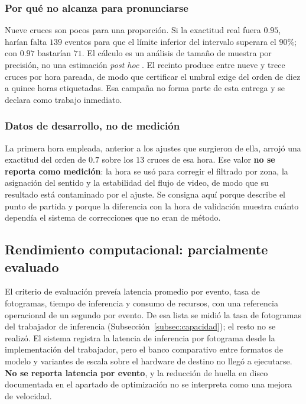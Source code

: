 \subsubsection{Por qué no alcanza para pronunciarse}

Nueve cruces son pocos para una proporción. Si la exactitud real fuera $0{.}95$,
harían falta $139$ eventos para que el límite inferior del intervalo superara el
$90\%$; con $0{.}97$ bastarían $71$. El cálculo es un análisis de tamaño de muestra
por precisión, no una estimación \emph{post hoc} \cite{cohen1988statistical}. El
recinto produce entre nueve y trece cruces por hora pareada, de modo que certificar
el umbral exige del orden de diez a quince horas etiquetadas. Esa campaña no forma
parte de esta entrega y se declara como trabajo inmediato.

\subsubsection{Datos de desarrollo, no de medición}

La primera hora empleada, anterior a los ajustes que surgieron de ella, arrojó una
exactitud del orden de $0{.}7$ sobre los $13$ cruces de esa hora. Ese valor
\textbf{no se reporta como medición}: la hora se usó para corregir el filtrado por
zona, la asignación del sentido y la estabilidad del flujo de video, de modo que su
resultado está contaminado por el ajuste. Se consigna aquí porque describe el punto
de partida y porque la diferencia con la hora de validación muestra cuánto dependía
el sistema de correcciones que no eran de método.

\subsection{Rendimiento computacional: parcialmente evaluado}

El criterio de evaluación preveía latencia promedio por evento, tasa de
fotogramas, tiempo de inferencia y consumo de recursos, con una referencia
operacional de un segundo por evento. De esa lista se midió la tasa de
fotogramas del trabajador de inferencia (Subsección~\ref{subsec:capacidad});
el resto no se realizó. El sistema registra la latencia de inferencia por
fotograma desde la implementación del trabajador, pero el banco comparativo
entre formatos de modelo y variantes de escala sobre el hardware de destino no
llegó a ejecutarse. \textbf{No se reporta latencia por evento}, y la reducción de
huella en disco documentada en el apartado de optimización no se interpreta como
una mejora de velocidad.

